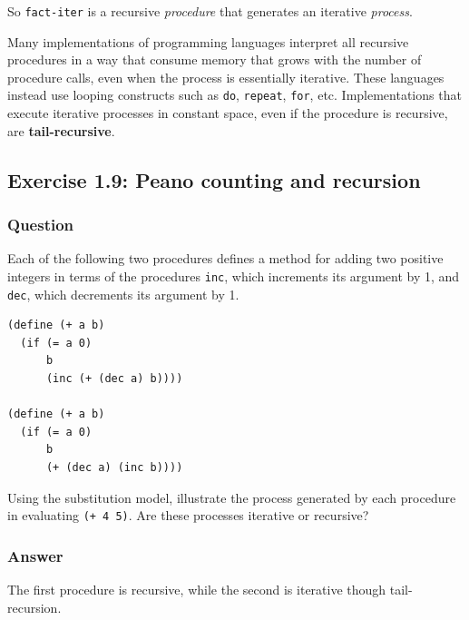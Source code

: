 \documentclass[final,fleqn,titlepage,twoside]{article}
\begin{document}
So \texttt{fact-iter} is a recursive \emph{procedure} that generates an iterative
\emph{process}.

Many implementations of programming languages interpret all recursive procedures
in a way that consume memory that grows with the number of procedure calls, even
when the process is essentially iterative. These languages instead use looping
constructs such as \texttt{do}, \texttt{repeat}, \texttt{for}, etc.
Implementations that execute iterative processes in constant space, even if the
procedure is recursive, are \textbf{tail-recursive}.

\subsection{Exercise 1.9: Peano counting and recursion}
\label{sec:org9d7e08a}
\subsubsection{Question}
\label{sec:org7c5c246}
Each of the following two procedures defines a method for adding two positive
integers in terms of the procedures \texttt{inc}, which increments its
argument by 1, and \texttt{dec}, which decrements its argument by 1.

\begin{verbatim}
(define (+ a b)
  (if (= a 0)
      b
      (inc (+ (dec a) b))))

(define (+ a b)
  (if (= a 0)
      b
      (+ (dec a) (inc b))))
\end{verbatim}

Using the substitution model, illustrate the process generated by each procedure
in evaluating \texttt{(+ 4 5)}. Are these processes iterative or recursive?

\subsubsection{Answer}
\label{sec:org2a7df86}
The first procedure is recursive, while the second is iterative though
tail-recursion.
\end{document}
